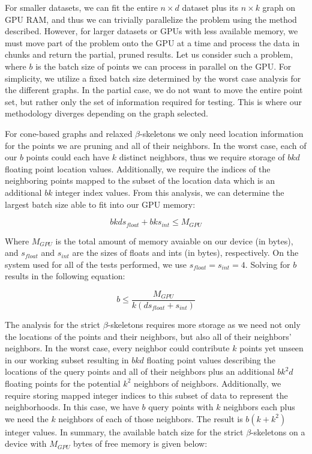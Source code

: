 For smaller datasets, we can fit the entire $n \times d$ dataset plus its $n \times k$ graph on GPU RAM, and thus we can trivially parallelize the problem using the method described.
%
However, for larger datasets or GPUs with less available memory, we must move part of the problem onto the GPU at a time and process the data in chunks and return the partial, pruned results.
%
Let us consider such a problem, where $b$ is the batch size of points we can process in parallel on the GPU.
%
For simplicity, we utilize a fixed batch size determined by the worst case analysis for the different graphs.
%
In the partial case, we do not want to move the entire point set, but rather only the set of information required for testing.
%
This is where our methodology diverges depending on the graph selected.

For cone-based graphs and relaxed $\beta$-skeletons we only need location information for the points we are pruning and all of their neighbors.
%
In the worst case, each of our $b$ points could each have $k$ distinct neighbors, thus we require storage of $bkd$ floating point location values.
%
Additionally, we require the indices of the neighboring points mapped to the subset of the location data which is an additional $bk$ integer index values.
%
From this analysis, we can determine the largest batch size able to fit into our GPU memory:

\begin{equation}
    bkds_{float} + bks_{int} \leq M_{GPU}
\end{equation}

Where $M_{GPU}$ is the total amount of memory avaiable on our device (in bytes), and $s_{float}$ and $s_{int}$ are the sizes of floats and ints (in bytes), respectively.
%
On the system used for all of the tests performed, we use $s_{float} = s_{int} = 4$.
%
Solving for $b$ results in the following equation:

\begin{equation}
    b \leq \frac{M_{GPU}}{k(ds_{float} + s_{int})}
\end{equation}

The analysis for the strict $\beta$-skeletons requires more storage as we need not only the locations of the points and their neighbors, but also all of their neighbors' neighbors.
%
In the worst case, every neighbor could contribute $k$ points yet unseen in our working subset resulting in $bkd$ floating point values describing the locations of the query points and all of their neighbors plus an additional $bk^2d$ floating points for the potential $k^2$ neighbors of neighbors.
%
Additionally, we require storing mapped integer indices to this subset of data to represent the neighborhoods.
%
In this case, we have $b$ query points with $k$ neighbors each plus we need the $k$ neighbors of each of those neighbors.
%
The result is $b(k + k^2)$ integer values.
%
In summary, the available batch size for the strict $\beta$-skeletons on a device with $M_{GPU}$ bytes of free memory is given below:

